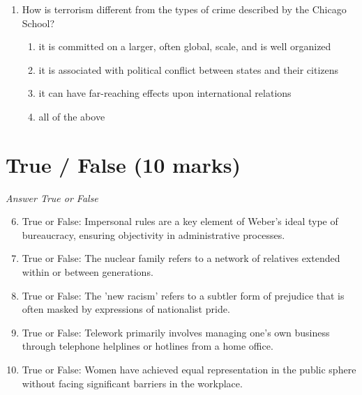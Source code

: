 \documentclass[12pt]{article}
\begin{document}
\begin{enumerate}[label=\arabic*.]
\begin{enumerate}[label=(\alph*)]
    \item decreased rates of prostitution and sex tourism
    \item developing countries can depend on it as a crucial source of income
    \item the exploitation of cheap, unregulated labour in poor countries
    \item we have become more aware of 'other' societies and ways of living
\end{enumerate}
\item How is terrorism different from the types of crime described by the Chicago School?
\begin{enumerate}[label=(\alph*)]
    \item it is committed on a larger, often global, scale, and is well organized
    \item it is associated with political conflict between states and their citizens
    \item it can have far-reaching effects upon international relations
    \item all of the above
\end{enumerate}
\end{enumerate}

\section*{True / False (10 marks)}
\textit{Answer True or False}
\begin{enumerate}[label=\arabic*.]
\setcounter{enumi}{5}
\item True or False: Impersonal rules are a key element of Weber's ideal type of bureaucracy, ensuring objectivity in administrative processes.
\item True or False: The nuclear family refers to a network of relatives extended within or between generations.
\item True or False: The 'new racism' refers to a subtler form of prejudice that is often masked by expressions of nationalist pride.
\item True or False: Telework primarily involves managing one's own business through telephone helplines or hotlines from a home office.
\item True or False: Women have achieved equal representation in the public sphere without facing significant barriers in the workplace.
\end{enumerate}
\end{document}
